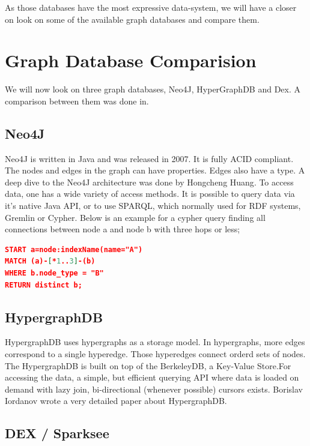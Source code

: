 \documentclass{acm_proc_article-sp}
\begin{document}
As those databases have the most expressive data-system, we will have a closer on look on some of the available graph databases and compare them.

\section{Graph Database Comparision}

We will now look on three graph databases, Neo4J, HyperGraphDB and Dex. A comparison between them was done in\cite{comparision}.

\subsection{Neo4J}

Neo4J is written in Java and was released in 2007. It is fully ACID compliant. The nodes and edges in the graph can have properties. Edges also have a type. A deep dive to the Neo4J architecture was done by Hongcheng Huang\cite{n4j}. To access data, one has a wide variety of access methods. It is possible to query data via it's native Java API, or to use SPARQL, which normally used for RDF systems, Gremlin or Cypher. Below is an example for a cypher query finding all connections between node a and node b with three hops or less;

\begin{lstlisting}[language=json,firstnumber=1]
START a=node:indexName(name="A")
MATCH (a)-[*1..3]-(b)
WHERE b.node_type = "B"
RETURN distinct b;
\end{lstlisting}

\subsection{HypergraphDB}

HypergraphDB uses hypergraphs as a storage model. In hypergraphs, more edges correspond to a single hyperedge. Those hyperedges connect orderd sets of nodes. The HypergraphDB is built on top of the BerkeleyDB, a Key-Value Store.For accessing the data, a simple, but efficient querying API where data is loaded on demand with lazy join, bi-directional (whenever possible) cursors exists. Borislav Iordanov wrote a very detailed paper about HypergraphDB\cite{hyper}.

\subsection{DEX / Sparksee}
\end{document}
